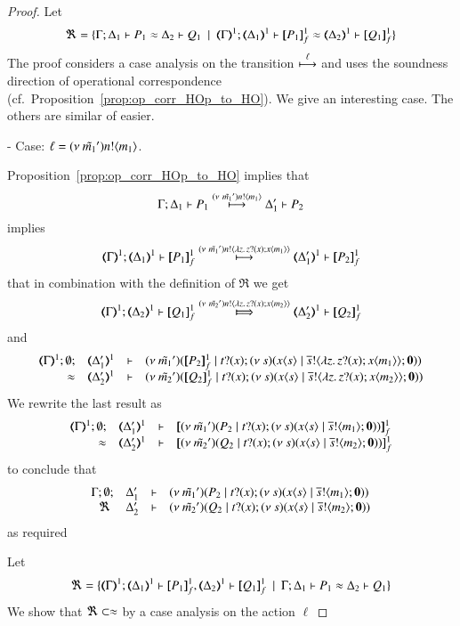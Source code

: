 \begin{proof}

	\noi Let
%
	\[
		\Re = \set{\horel{\Gamma}{\Delta_1}{P_1}{\wb}{\Delta_2}{Q_1} \setbar \horel{\mapt{\Gamma}^{1}}{\mapt{\Delta_1}^{1}}{\pmapp{P_1}{1}{f}}{\wb}{\mapt{\Delta_2}^{1}}{\pmapp{Q_1}{1}{f}}}
	\]
%
	\noi	The proof considers a case analysis on the transition $\stackrel{\ell}{\longmapsto}$ and
		uses the soundness direction of operational correspondence (cf.~Proposition~\ref{prop:op_corr_HOp_to_HO}).
		We give an interesting case. The others are similar of easier.

	\noi	- Case: $\ell = (\nu\ \tilde{m_1}') n ! \langle m_1 \rangle$.

	\noi Proposition~\ref{prop:op_corr_HOp_to_HO} implies that
%
	\[
		\Gamma; \Delta_1 \vdash P_1 \stackrel{(\nu\ \tilde{m_1}') n ! \langle m_1 \rangle}{\longmapsto} \Delta_1' \vdash P_2
	\]
%
	\noi implies
%
	\[
		\horel{\mapt{\Gamma}^{1}}{\mapt{\Delta_1}^{1}}{\pmapp{P_1}{1}{f}}{\hby{\news{\tilde{m_1}'} \bactout{n}{\abs{z}{\binp{z}{x} \appl{x}{m_1}}}}}{\mapt{\Delta_1'}^{1}}{\pmapp{P_2}{1}{f}}
	\]
%
	\noi that in combination with the definition of $\Re$ we get
%
	\begin{eqnarray}
		\horel{\mapt{\Gamma}^{1}}{\mapt{\Delta_2}^{1}}{\pmapp{Q_1}{1}{f}}{\Hby{\news{\tilde{m_2}'} \bactout{n}{\abs{z}{\binp{z}{x} \appl{x}{m_2}}}}}{\mapt{\Delta_2'}^{1}}{\pmapp{Q_2}{1}{f}}
		\label{prop:HOp_to_HO:full_abs11}
	\end{eqnarray}
%
	\noi and
%
	\[
		\mhorel{\mapt{\Gamma}^{1}}{\mapt{\Delta_1'}^{1}}{\newsp{\tilde{m_1}'}{\pmapp{P_2}{1}{f} \Par \hotrigger{t}{x}{s}{\abs{z}{\binp{z}{x} \appl{x}{m_1}}} }}
		{\wb}{\mapt{\Delta_2'}^{1}}{}{\newsp{\tilde{m_2}'}{\pmapp{Q_2}{1}{f} \Par \hotrigger{t}{x}{s}{\abs{z}{\binp{z}{x} \appl{x}{m_2}}}}}
	\]
%
	\noi We rewrite the last result as
	\[
		\mhorel{\mapt{\Gamma}^{1}}{\mapt{\Delta_1'}^{1}}{\pmapp{\newsp{\tilde{m_1}'}{P_2 \Par \hotrigger{t}{x}{s}{m_1}}}{1}{f}}
		{\wb}{\mapt{\Delta_2'}^{1}}{}{\pmapp{\newsp{\tilde{m_2}'}{Q_2 \Par \hotrigger{t}{x}{s}{m_2}}}{1}{f}}
	\]
%
	\noi to conclude that
%
	\[
		\begin{array}{rcll} \Gamma; \emptyset; &\Delta_1'& \vdash& (\nu\ \tilde{m_1}')(P_2 \;|\; t ? (x) ; (\nu\ s)(x\langle s \rangle \;|\; \overline{s} ! \langle m_1 \rangle ; \mathbf{0}))\\ \ \Re\  &\Delta_2'& \vdash &  (\nu\ \tilde{m_2}')(Q_2 \;|\; t ? (x) ; (\nu\ s)(x\langle s \rangle \;|\; \overline{s} ! \langle m_2 \rangle ; \mathbf{0})) \end{array}
	\]
%
	\noi as required



	\noi Let
%
	\[
		\Re = \set{\horel{\mapt{\Gamma}^{1}}{\mapt{\Delta_1}^{1}}{\pmapp{P_1}{1}{f}}{,}{\mapt{\Delta_2}^{1}}{\pmapp{Q_1}{1}{f}} \setbar \horel{\Gamma}{\Delta_1}{P_1}{\wb}{\Delta_2}{Q_1}}
	\]
%
	We show that $\Re \subset \approx$ by a case analysis on the action $\ell$


\end{proof}
